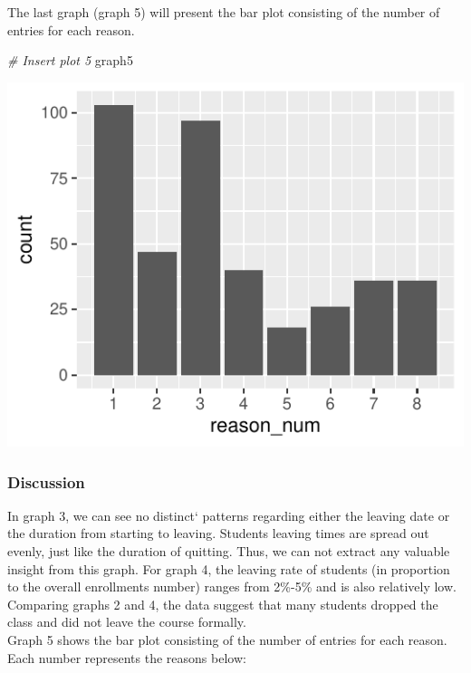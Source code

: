 \documentclass[12pt,]{article}
\newenvironment{Shaded}{\begin{snugshade}}{\end{snugshade}}
\newcommand{\CommentTok}[1]{\textcolor[rgb]{0.56,0.35,0.01}{\textit{#1}}}
\newcommand{\NormalTok}[1]{#1}
\begin{document}
The last graph (graph 5) will present the bar plot consisting of the
number of entries for each reason.

\begin{Shaded}
\begin{Highlighting}[]
\CommentTok{\# Insert plot 5}
\NormalTok{graph5}
\end{Highlighting}
\end{Shaded}

\begin{center}\includegraphics{report_files/figure-latex/unnamed-chunk-7-1} \end{center}

\hypertarget{discussion-1}{%
\subsubsection{Discussion}\label{discussion-1}}

In graph 3, we can see no distinct` patterns regarding either the
leaving date or the duration from starting to leaving. Students leaving
times are spread out evenly, just like the duration of quitting. Thus,
we can not extract any valuable insight from this graph. For graph 4,
the leaving rate of students (in proportion to the overall enrollments
number) ranges from 2\%-5\% and is also relatively low. Comparing graphs
2 and 4, the data suggest that many students dropped the class and did
not leave the course formally.\\
\hfill\break Graph 5 shows the bar plot consisting of the number of
entries for each reason. Each number represents the reasons below:
\end{document}
